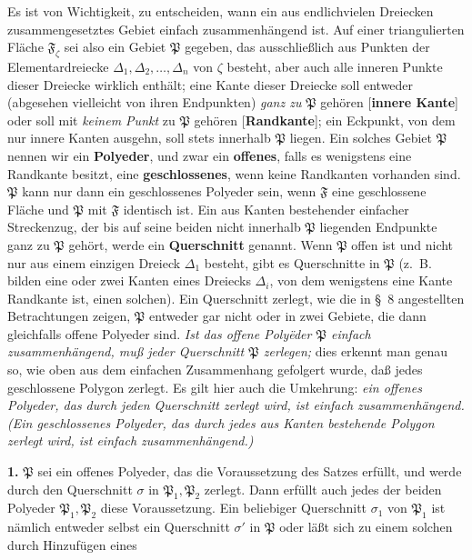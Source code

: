 \documentclass{article}
\begin{document}
Es ist von Wichtigkeit, zu entscheiden, wann ein aus endlichvielen Dreiecken zusammengesetztes Gebiet einfach zusammenhängend ist. Auf einer triangulierten Fläche $\mathfrak{F}_\zeta$ sei also ein Gebiet $\mathfrak{P}$ gegeben, das ausschließlich aus Punkten der Elementardreiecke $\Delta_1, \Delta_2, \dots, \Delta_n$ von $\zeta$ besteht, aber auch alle inneren Punkte dieser Dreiecke wirklich enthält; eine Kante dieser Dreiecke soll entweder (abgesehen vielleicht von ihren Endpunkten) \emph{ganz zu} $\mathfrak{P}$ gehören [\textbf{innere Kante}] oder soll mit \emph{keinem Punkt} zu $\mathfrak{P}$ gehören [\textbf{Randkante}]; ein Eckpunkt, von dem nur innere Kanten ausgehn, soll stets innerhalb $\mathfrak{P}$ liegen. Ein solches Gebiet $\mathfrak{P}$ nennen wir ein \textbf{Polyeder}, und zwar ein \textbf{offenes}, falls es wenigstens eine Randkante besitzt, eine \textbf{geschlossenes}, wenn keine Randkanten vorhanden sind. $\mathfrak{P}$ kann nur dann ein geschlossenes Polyeder sein, wenn $\mathfrak{F}$ eine geschlossene Fläche und $\mathfrak{P}$ mit $\mathfrak{F}$ identisch ist. Ein aus Kanten bestehender einfacher Streckenzug, der bis auf seine beiden nicht innerhalb $\mathfrak{P}$ liegenden Endpunkte ganz zu $\mathfrak{P}$ gehört, werde ein \textbf{Querschnitt} genannt. Wenn $\mathfrak{P}$ offen ist und nicht nur aus einem einzigen Dreieck $\Delta_1$ besteht, gibt es Querschnitte in $\mathfrak{P}$ (z.~B. bilden eine oder zwei Kanten eines Dreiecks $\Delta_i$, von dem wenigstens eine Kante Randkante ist, einen solchen). Ein Querschnitt zerlegt, wie die in §~8 angestellten Betrachtungen zeigen, $\mathfrak{P}$ entweder gar nicht oder in zwei Gebiete, die dann gleichfalls offene Polyeder sind. \emph{Ist das offene Polyëder $\mathfrak{P}$ einfach zusammenhängend, muß jeder Querschnitt $\mathfrak{P}$ zerlegen;} dies erkennt man genau so, wie oben aus dem einfachen Zusammenhang gefolgert wurde, daß jedes geschlossene Polygon zerlegt. Es gilt hier auch die Umkehrung: \emph{ein offenes Polyeder, das durch jeden Querschnitt zerlegt wird, ist einfach zusammenhängend. (Ein geschlossenes Polyeder, das durch jedes aus Kanten bestehende Polygon zerlegt wird, ist einfach zusammenhängend.)}


\textbf{1.} $\mathfrak{P}$ sei ein offenes Polyeder, das die Voraussetzung des Satzes erfüllt, und werde durch den Querschnitt $\sigma$ in $\mathfrak{P}_1, \mathfrak{P}_2$ zerlegt. Dann erfüllt auch jedes der beiden Polyeder $\mathfrak{P}_1, \mathfrak{P}_2$ diese Voraussetzung. Ein beliebiger Querschnitt $\sigma_1$ von $\mathfrak{P}_1$ ist nämlich entweder selbst ein Querschnitt $\sigma'$ in $\mathfrak{P}$ oder läßt sich zu einem solchen durch Hinzufügen eines
\end{document}
